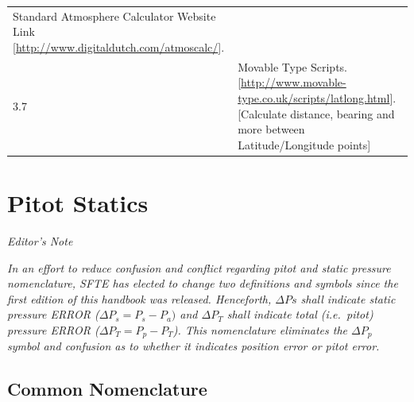 \documentclass[
]{book}
\begin{document}
\begin{longtable}[]{@{}ll@{}}
\begin{minipage}[t]{0.88\columnwidth}
Standard Atmosphere Calculator Website Link {[}\url{http://www.digitaldutch.com/atmoscalc/}{]}.\strut
\end{minipage}\tabularnewline
\begin{minipage}[t]{0.06\columnwidth}\raggedright
3.7\strut
\end{minipage} & \begin{minipage}[t]{0.88\columnwidth}\raggedright
Movable Type Scripts. {[}\url{http://www.movable-type.co.uk/scripts/latlong.html}{]}. {[}Calculate distance, bearing and more between Latitude/Longitude points{]}\strut
\end{minipage}\tabularnewline
\bottomrule
\end{longtable}

\hypertarget{pitot-statics}{%
\chapter{Pitot Statics}\label{pitot-statics}}

\emph{Editor's Note}

\emph{In an effort to reduce confusion and conflict regarding pitot and static pressure nomenclature, SFTE has elected to change two definitions and symbols since the first edition of this handbook was released. Henceforth, \(\Delta Ps\) shall indicate static pressure ERROR (\(\Delta P_s = P_s - P_a)\) and \(\Delta P_T\) shall indicate total (i.e.~pitot) pressure ERROR (\(\Delta P_T = P_p - P_T\)). This nomenclature eliminates the \(\Delta P_p\) symbol and confusion as to whether it indicates position error or pitot error.}

\hypertarget{common-nomenclature}{%
\section*{Common Nomenclature}\label{common-nomenclature}}
\end{document}
